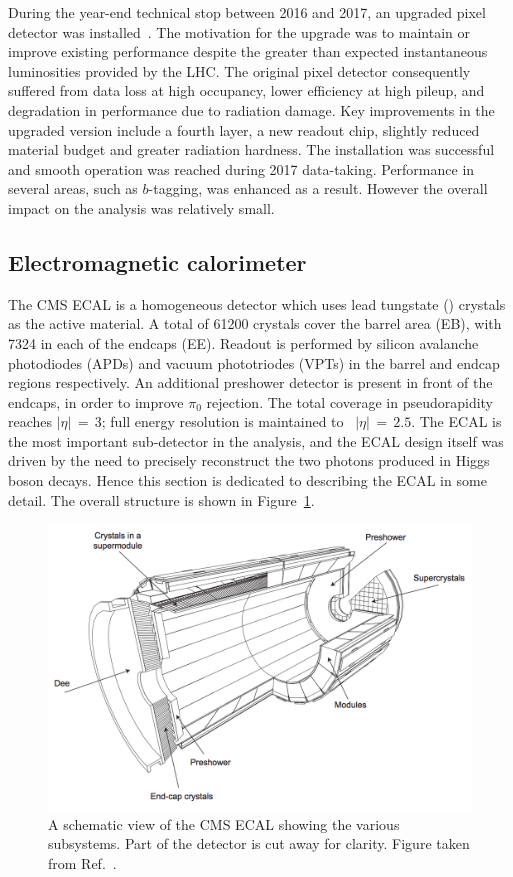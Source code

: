 During the year-end technical stop between 2016 and 2017, an upgraded pixel detector was installed~\cite{PixelUpgrade}.
The motivation for the upgrade was to maintain or improve existing performance despite the greater than expected instantaneous luminosities provided by the LHC.
The original pixel detector consequently suffered from data loss at high occupancy, lower efficiency at high pileup, and degradation in performance due to radiation damage.
Key improvements in the upgraded version include a fourth layer, a new readout chip, slightly reduced material budget and greater radiation hardness.
The installation was successful and smooth operation was reached during 2017 data-taking.
Performance in several areas, such as $b$-tagging, was enhanced as a result.
However the overall impact on the \Hgg analysis was relatively small.

\subsection{Electromagnetic calorimeter}

The CMS ECAL is a homogeneous detector which uses lead tungstate (\pbw) crystals as the active material.
A total of 61200 crystals cover the barrel area (EB), with 7324 in each of the endcaps (EE).
Readout is performed by silicon avalanche photodiodes (APDs) and vacuum phototriodes (VPTs) in the barrel and endcap regions respectively.
An additional preshower detector is present in front of the endcaps, in order to improve $\pi_0$ rejection.
The total coverage in pseudorapidity reaches $|\eta|\,=\,3$; full energy resolution is maintained to ~$|\eta|\,=\,2.5$.
The ECAL is the most important sub-detector in the \Hgg analysis, 
and the ECAL design itself was driven by the need to precisely reconstruct the two photons produced in Higgs boson decays.
Hence this section is dedicated to describing the ECAL in some detail.
The overall structure is shown in Figure~\ref{fig:detector_ECALschematic}.

\begin{figure}[h!]
  \centering
  \includegraphics[width=\textwidth]{Figures/Detector/ECALschematic.png}
  \caption[Schematic view of the CMS ECAL.]
  {A schematic view of the CMS ECAL showing the various subsystems.
  Part of the detector is cut away for clarity.
  Figure taken from Ref.~\cite{ECALperformance}.}
  \label{fig:detector_ECALschematic}
\end{figure}

